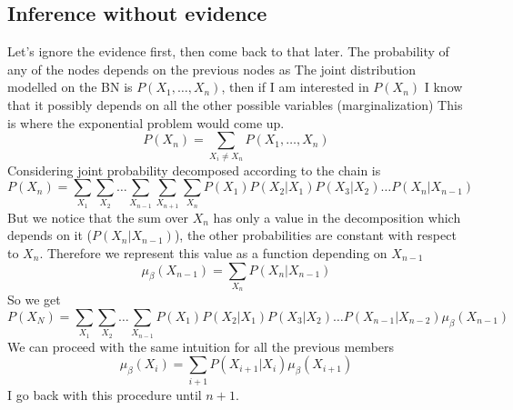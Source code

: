 \subsection{Inference without evidence}
Let's ignore the evidence first, then come back to that later. The probability of
any of the nodes depends on the previous nodes as The joint distribution modelled
on the BN is $P(X_{1}, \dots, X_{n})$, then if I am interested in $P(X_{n})$ I
know that it possibly depends on all the other possible variables (marginalization)
This is where the exponential problem would come up.
\[
	P(X_{n}) = \sum_{X_i \neq X_n}P(X_{1}, \dots, X_{n})
\]
Considering joint probability decomposed according to the chain is
\[
	P(X_{n}) = \sum_{X_1}\sum_{X_2}\dots \sum_{X_{n-1}}\sum_{X_{n+1}}\sum_{X_n}P(X_{1}
	)P(X_{2}|X_{1})P(X_{3}|X_{2})\dots P(X_{n}|X_{n-1})
\]
But we notice that the sum over $X_{n}$ has only a value in the decomposition which
depends on it ($P(X_{n}|X_{n-1})$), the other probabilities are constant with
respect to $X_{n}$. Therefore we represent this value as a function depending on
$X_{n-1}$
\[
	\mu_{\beta} (X_{n-1}) = \sum_{X_n}P(X_{n}|X_{n-1})
\]
So we get
\[
	P(X_{N}) = \sum_{X_1}\sum_{X_2}\dots \sum_{X_{n-1}}P(X_{1})P(X_{2}|X_{1})P(X_{3}
	|X_{2})\dots P(X_{n-1}|X_{n-2}) \mu_{\beta} (X_{n-1})
\]
We can proceed with the same intuition for all the previous members
\[
	\mu_{\beta} (X_{i}) = \sum_{i+1}P(X_{i+1}|X_{i})\mu_{\beta}(X_{i+1})
\]
I go back with this procedure until $n+1$.\\

